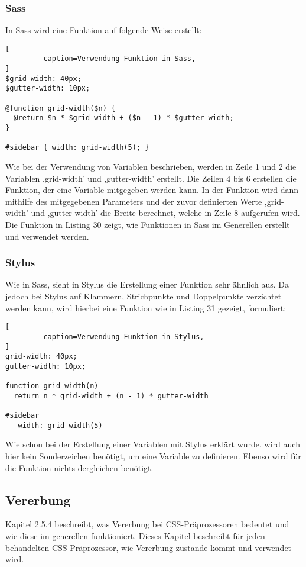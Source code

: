 \subsubsection{Sass}
In Sass wird eine Funktion auf folgende Weise erstellt:
\begin{lstlisting}[
         caption=Verwendung Funktion in Sass,
]
$grid-width: 40px;
$gutter-width: 10px;

@function grid-width($n) {
  @return $n * $grid-width + ($n - 1) * $gutter-width;
}

#sidebar { width: grid-width(5); }
\end{lstlisting}
Wie bei der Verwendung von Variablen beschrieben, werden in Zeile 1 und 2 die Variablen ,grid-width' und ,gutter-width' erstellt. Die Zeilen 4 bis 6 erstellen die Funktion, der eine Variable mitgegeben werden kann. In der Funktion wird dann mithilfe des mitgegebenen Parameters und der zuvor definierten Werte ,grid-width' und ,gutter-width' die Breite berechnet, welche in Zeile 8 aufgerufen wird.\newline
Die Funktion in Listing 30 zeigt, wie Funktionen in Sass im Generellen erstellt und verwendet werden.  
\subsubsection{Stylus}
Wie in Sass, sieht in Stylus die Erstellung einer Funktion sehr ähnlich aus. Da jedoch bei Stylus auf Klammern, Strichpunkte und Doppelpunkte verzichtet werden kann, wird hierbei eine Funktion wie in Listing 31 gezeigt, formuliert:
\begin{lstlisting}[
         caption=Verwendung Funktion in Stylus,
]
grid-width: 40px;
gutter-width: 10px;

function grid-width(n) 
  return n * grid-width + (n - 1) * gutter-width

#sidebar 
   width: grid-width(5)
\end{lstlisting}
Wie schon bei der Erstellung einer Variablen mit Stylus erklärt wurde, wird auch hier kein Sonderzeichen benötigt, um eine Variable zu definieren. Ebenso wird für die Funktion nichts dergleichen benötigt. \newline

\subsection{Vererbung}
Kapitel 2.5.4 beschreibt, was Vererbung bei CSS-Präprozessoren bedeutet und wie diese im generellen funktioniert. Dieses Kapitel beschreibt für jeden behandelten CSS-Präprozessor, wie Vererbung zustande kommt und verwendet wird.
